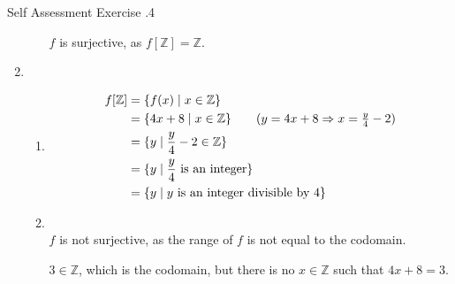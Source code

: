 \documentclass[../notes.tex]{subfiles}
\begin{document}
\begin{exercise}{Self Assessment Exercise \thechapter.4}
\begin{enumerate}
\begin{enumerate}[label=(\alph*)]
								$f$ is surjective, as $f[\mathbb{Z}] = \mathbb{Z}$.
						\end{enumerate}
					\pagebreak
					\item {}
						\begin{enumerate}[label=(\alph*)]
							\item {}
								\begin{align*}
									f[\mathbb{Z}] &= \{f(x) \mid x \in \mathbb{Z}\}\\
									&= \{4x + 8 \mid x \in \mathbb{Z}\} \tag*{$(y = 4x + 8 \Rightarrow x = \frac{y}{4} - 2)$}\\
									&= \{y \mid \frac{y}{4} - 2 \in \mathbb{Z}\}\\
									&= \{y \mid \frac{y}{4} \text{ is an integer}\}\\
									&= \{y \mid y \text{ is an integer divisible by 4}\}
								\end{align*}
								\item {}\\
									$f$ is not surjective, as the range of $f$ is not equal to the codomain.
									\begin{subproof}[Counterexample]
										$3 \in \mathbb{Z}$, which is the codomain, but there is no $x \in \mathbb{Z}$ such that $4x + 8 = 3$.
									\end{subproof}
						\end{enumerate}
				\end{enumerate}
			\end{exercise}
		\pagebreak
\end{document}
